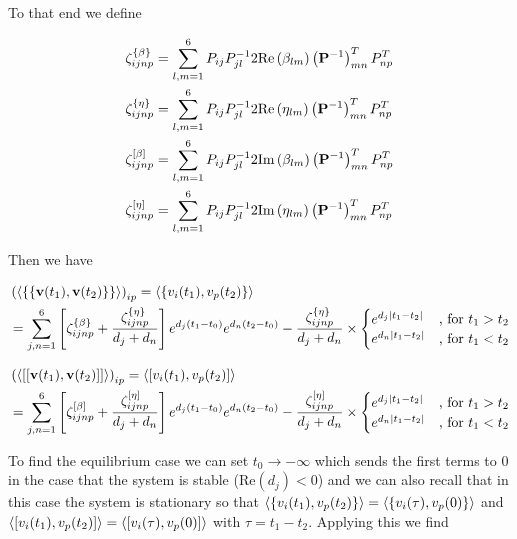 \documentclass[12pt]{article}
\newcommand{\bv}[1]{\bold{#1}}
\begin{document}
To that end we define

\begin{align}
\zeta_{ijnp}^{\{\beta\}} &= \sum_{l,m=1}^6 P_{ij} P^{-1}_{jl} 2\text{Re}\left(\beta_{lm}\right) \left(\bv{P}^{-1}\right)^T_{mn} P^{T}_{np}\\
\zeta_{ijnp}^{\{\eta\}} &= \sum_{l,m=1}^6 P_{ij} P^{-1}_{jl} 2\text{Re}\left(\eta_{lm}\right) \left(\bv{P}^{-1}\right)^T_{mn} P^{T}_{np}\\
\zeta_{ijnp}^{[\beta]} &= \sum_{l,m=1}^6 P_{ij} P^{-1}_{jl} 2\text{Im}\left(\beta_{lm}\right) \left(\bv{P}^{-1}\right)^T_{mn} P^{T}_{np}\\
\zeta_{ijnp}^{[\eta]} &= \sum_{l,m=1}^6 P_{ij} P^{-1}_{jl} 2\text{Im}\left(\eta_{lm}\right) \left(\bv{P}^{-1}\right)^T_{mn} P^{T}_{np}\\
\end{align}

Then we have

\begin{align}
&\left(\Braket{\left\{\left\{\bv{v}(t_1),\bv{v}(t_2)\right\}\right\}}\right)_{ip} = \Braket{\left\{v_i(t_1),v_p(t_2)\right\}} \\
&=\sum_{j,n=1}^6 \left[\zeta_{ijnp}^{\{\beta\}} + \frac{\zeta_{ijnp}^{\{\eta\}}}{d_j+d_n}\right]e^{d_j (t_1-t_0)}e^{d_n (t_2-t_0)} - \frac{\zeta_{ijnp}^{\{\eta\}}}{d_j+d_n} \times 
\begin{cases}
e^{d_j \lvert t_1-t_2\rvert} & \text{, for } t_1>t_2\\
e^{d_n \lvert t_1-t_2\rvert} & \text{, for } t_1<t_2\\
\end{cases}
\end{align}

\begin{align}
&\left(\Braket{\left[\left[\bv{v}(t_1),\bv{v}(t_2)\right]\right]}\right)_{ip} = \Braket{\left[v_i(t_1),v_p(t_2)\right]} \\
&=\sum_{j,n=1}^6 \left[\zeta_{ijnp}^{[\beta]} + \frac{\zeta_{ijnp}^{[\eta]}}{d_j+d_n}\right]e^{d_j (t_1-t_0)}e^{d_n (t_2-t_0)} - \frac{\zeta_{ijnp}^{[\eta]}}{d_j+d_n} \times 
\begin{cases}
e^{d_j \lvert t_1-t_2\rvert} & \text{, for } t_1>t_2\\
e^{d_n \lvert t_1-t_2\rvert} & \text{, for } t_1<t_2\\
\end{cases}
\end{align}

To find the equilibrium case we can set $t_0 \rightarrow -\infty$ which sends the first terms to 0 in the case that the system is stable ($\text{Re}(d_j) < 0 $) and we can also recall that in this case the system is stationary so that $\Braket{\left\{v_i(t_1),v_p(t_2)\right\}} = \Braket{\left\{v_i(\tau),v_p(0)\right\}}$ and $\Braket{\left[v_i(t_1),v_p(t_2)\right]} = \Braket{\left[v_i(\tau),v_p(0)\right]}$ with $\tau = t_1 - t_2$. Applying this we find
\end{document}
